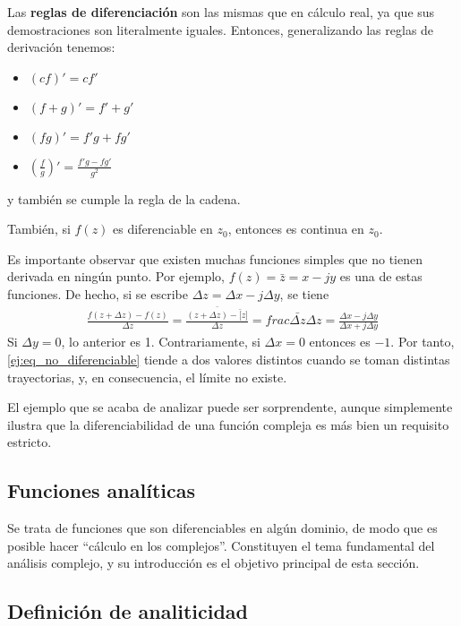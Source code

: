 Las \textbf{reglas de diferenciación} son las mismas que en cálculo real, ya que sus demostraciones son literalmente iguales. Entonces, generalizando las reglas de derivación tenemos:
\begin{itemize}
  \item $(cf)'=cf'$ 
  \item $(f+g)'=f'+g'$
  \item $(fg)'=f'g+fg'$
  \item $\left(\frac{f}{g}\right)'=\frac{f'g-fg'}{g^2}$
\end{itemize}
y también se cumple la regla de la cadena.

También, si $f(z)$ es diferenciable en $z_0$, entonces es continua en $z_0$.

\begin{example}
  Es importante observar que existen muchas funciones simples que no tienen derivada en ningún punto. Por ejemplo, $f(z)=\bar{z}=x-jy$ es una de estas funciones. De hecho, si se escribe $\Delta z = \Delta x - j\Delta y$, se tiene 
  \begin{align}
    \frac{f(z+\Delta z) - f(z)}{\Delta z} = \frac{\bar{(z+\Delta z)-\bar[z]}}{\Delta z} = frac{\bar{\Delta z}}{\Delta z} = \frac{\Delta x - j\Delta y}{\Delta x + j\Delta y}
    \label{ej:eq_no_diferenciable}
  \end{align}
  Si $\Delta y = 0$, lo anterior es 1. Contrariamente, si $\Delta x = 0$ entonces es $-1$. Por tanto, \ref{ej:eq_no_diferenciable} tiende a dos valores distintos cuando se toman distintas trayectorias, y, en consecuencia, el límite no existe.
\end{example}

El ejemplo que se acaba de analizar puede ser sorprendente, aunque simplemente ilustra que la diferenciabilidad de una función compleja es más bien un requisito estricto.

\subsection{Funciones analíticas}

Se trata de funciones que son diferenciables en algún dominio, de modo que es posible hacer ``cálculo en los complejos''. Constituyen el tema fundamental del análisis complejo, y su introducción es el objetivo principal de esta sección. 

\subsection{Definición de analiticidad}

